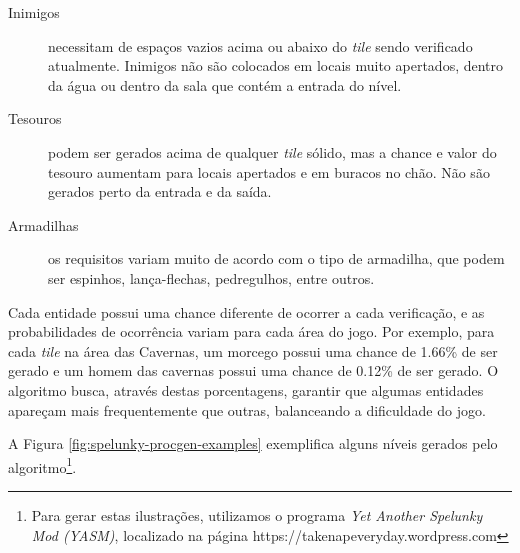 \begin{description}
	\item[Inimigos]
	necessitam de espaços vazios acima ou abaixo do \textit{tile} sendo
	verificado atualmente. Inimigos não são colocados em locais muito apertados,
	dentro da água ou dentro da sala que contém a entrada do nível.

	\item[Tesouros]
	podem ser gerados acima de qualquer \textit{tile} sólido, mas a chance e
	valor do tesouro aumentam para locais apertados e em buracos no chão. Não
	são gerados perto da entrada e da saída.

	\item[Armadilhas]
	os requisitos variam muito de acordo com o tipo de armadilha, que podem ser
	espinhos, lança-flechas, pedregulhos, entre outros.
\end{description}

Cada entidade possui uma chance diferente de ocorrer a cada verificação, e as
probabilidades de ocorrência variam para cada área do jogo. Por exemplo, para
cada \textit{tile} na área das Cavernas, um morcego possui uma chance de 1.66\%
de ser gerado e um homem das cavernas possui uma chance de 0.12\% de ser gerado.
O algoritmo busca, através destas porcentagens, garantir que algumas entidades
apareçam mais frequentemente que outras, balanceando a dificuldade do jogo.

A Figura \ref{fig:spelunky-procgen-examples} exemplifica alguns níveis gerados
pelo algoritmo\footnote{Para gerar estas ilustrações, utilizamos o programa
\textit{Yet Another Spelunky Mod (YASM)}, localizado na página
https://takenapeveryday.wordpress.com}.

